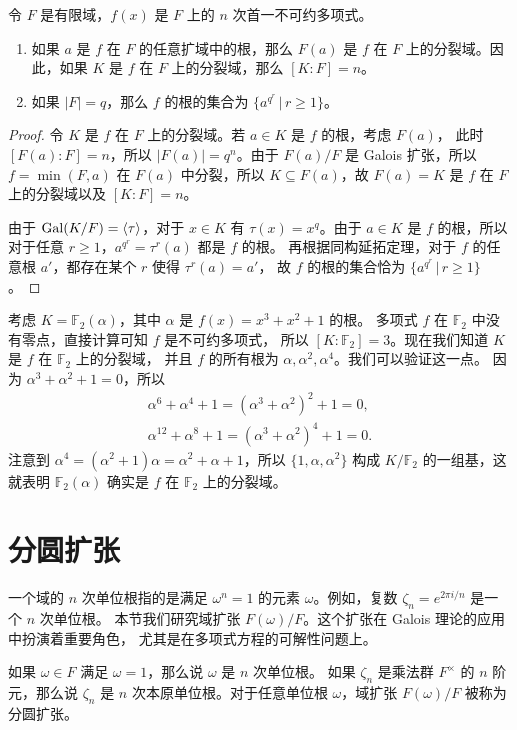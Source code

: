 \begin{corollary}
  令 $F$ 是有限域，$f(x)$ 是 $F$ 上的 $n$ 次首一不可约多项式。
  \begin{enumerate}
    \item 如果 $a$ 是 $f$ 在 $F$ 的任意扩域中的根，那么 $F(a)$ 是 $f$
    在 $F$ 上的分裂域。因此，如果 $K$ 是 $f$ 在 $F$ 上的分裂域，那么
    $[K:F]=n$。
    \item 如果 $|F|=q$，那么 $f$ 的根的集合为 $\big\{a^{q^r}\,|\, r\geq 1\big\}$。
  \end{enumerate}
\end{corollary}
\begin{proof}
  令 $K$ 是 $f$ 在 $F$ 上的分裂域。若 $a\in K$ 是 $f$ 的根，考虑 $F(a)$，
  此时 $[F(a):F]=n$，所以 $|F(a)|=q^n$。由于 $F(a)/F$ 是 Galois 扩张，所以 
  $f=\min(F,a)$ 在 $F(a)$ 中分裂，所以 $K\subseteq F(a)$，故 $F(a)=K$
  是 $f$ 在 $F$ 上的分裂域以及 $[K:F]=n$。

  由于 $\operatorname{Gal}(K/F)=\langle\tau\rangle$，对于 $x\in K$ 有 $\tau(x)=x^{q}$。由于 $a\in K$
  是 $f$ 的根，所以对于任意 $r\geq 1$，$a^{q^r}=\tau^r(a)$ 都是 $f$ 的根。
  再根据同构延拓定理，对于 $f$ 的任意根 $a'$，都存在某个 $r$ 使得 $\tau^r(a)=a'$，
  故 $f$ 的根的集合恰为 $\big\{a^{q^r}\,|\, r\geq 1\big\}$。
\end{proof}

\begin{example}
  考虑 $K=\mathbb{F}_2(\alpha)$，其中 $\alpha$ 是 $f(x)=x^3+x^2+1$ 的根。
  多项式 $f$ 在 $\mathbb{F}_2$ 中没有零点，直接计算可知 $f$ 是不可约多项式，
  所以 $[K:\mathbb{F}_2]=3$。现在我们知道 $K$ 是 $f$ 在 $\mathbb{F}_2$ 上的分裂域，
  并且 $f$ 的所有根为 $\alpha,\alpha^2,\alpha^4$。我们可以验证这一点。
  因为 $\alpha^3+\alpha^2+1=0$，所以 
  \begin{gather*}
    \alpha^6+\alpha^4+1=(\alpha^3+\alpha^2)^2+1=0,\\
    \alpha^{12}+\alpha^8+1=(\alpha^3+\alpha^2)^4+1=0.
  \end{gather*}
  注意到 $\alpha^4=(\alpha^2+1)\alpha=\alpha^2+\alpha+1$，所以 
  $\{1,\alpha,\alpha^2\}$ 构成 $K/\mathbb{F}_2$ 的一组基，这就表明 $\mathbb{F}_2(\alpha)$
  确实是 $f$ 在 $\mathbb{F}_2$ 上的分裂域。
\end{example}


\section{分圆扩张}

一个域的 $n$ 次单位根指的是满足 $\omega^n=1$ 的元素 $\omega$。例如，复数 $\zeta_n=e^{2\pi i/n}$ 是一个 $n$ 次单位根。
本节我们研究域扩张 $F(\omega)/F$。这个扩张在 Galois 理论的应用中扮演着重要角色，
尤其是在多项式方程的可解性问题上。

\begin{definition}
  如果 $\omega\in F$ 满足 $\omega=1$，那么说 $\omega$ 是 $n$ 次单位根。
  如果 $\zeta_n$ 是乘法群 $F^\times$ 的 $n$ 阶元，那么说 $\zeta_n$ 是 
  $n$ 次本原单位根。对于任意单位根 $\omega$，域扩张 $F(\omega)/F$ 被称为
  分圆扩张。
\end{definition}





